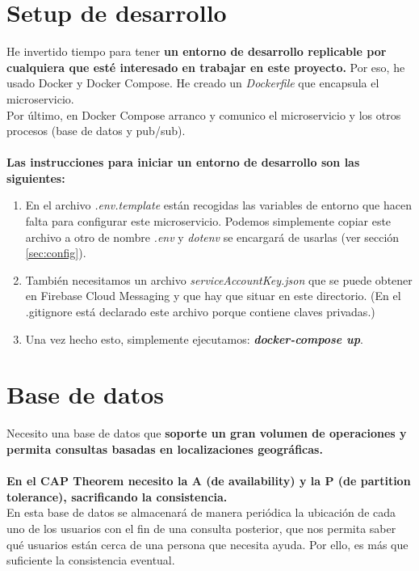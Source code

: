 \section{Setup de desarrollo}\label{sec:dev}

He invertido tiempo para tener \textbf{un entorno de desarrollo replicable por cualquiera que esté interesado en trabajar en este proyecto.}
Por eso, he usado Docker y Docker Compose. He creado un \textit{Dockerfile} que encapsula el microservicio. 
\\ Por último, en Docker Compose arranco y comunico el microservicio y los otros procesos (base de datos y pub/sub). \\ \\
\textbf{Las instrucciones para iniciar un entorno de desarrollo son las siguientes:}

\begin{enumerate}
	\item En el archivo \textit{.env.template} están recogidas las variables de entorno que hacen falta para configurar este microservicio.
Podemos simplemente copiar este archivo a otro de nombre \textit{.env} y \textit{dotenv} se encargará de usarlas (ver sección \ref{sec:config}).
\item También necesitamos un archivo \textit{serviceAccountKey.json} que se puede obtener en Firebase Cloud Messaging y que hay que situar en este directorio. 
(En el .gitignore está declarado este archivo porque contiene claves privadas.)
\item Una vez hecho esto, simplemente ejecutamos: \textbf{\textit{docker-compose up}}.
\end{enumerate}

\section{Base de datos}

Necesito una base de datos que \textbf{soporte un gran volumen de operaciones y permita consultas basadas en localizaciones geográficas.} \\ \\
\textbf{En el CAP Theorem necesito la A (de availability) y la P (de partition tolerance), sacrificando la consistencia.}
\\
En esta base de datos se almacenará de manera periódica la ubicación de cada uno de los usuarios con el fin de una consulta posterior, que nos permita saber qué usuarios
están cerca de una persona que necesita ayuda. Por ello, es más que suficiente la consistencia eventual.

